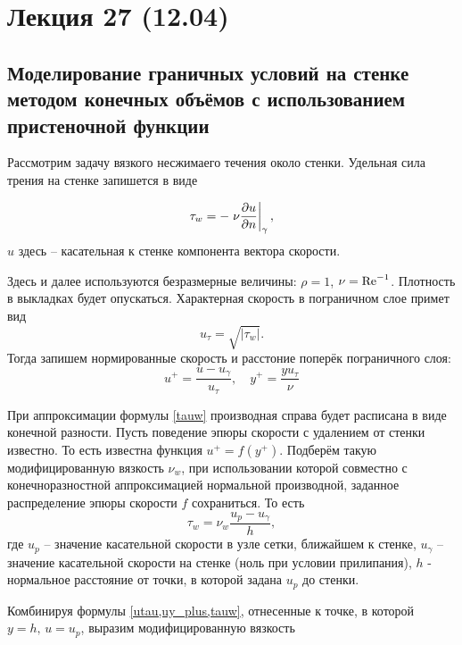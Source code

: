 \section{Лекция 27 (12.04)}

\subsection{Моделирование граничных условий на стенке методом конечных объёмов с использованием пристеночной функции}

Рассмотрим задачу вязкого несжимаего течения около стенки.
Удельная сила трения на стенке запишется в виде

\begin{equation}
\label{tauw}
\tau_w = -\left.\nu\frac{\partial u}{\partial n}\right|_{\gamma},
\end{equation}
$u$ здесь -- касательная к стенке компонента вектора скорости.

Здесь и далее используются безразмерные величины: $\rho=1$, $\nu = \mathrm{Re}^{-1}$.
Плотность в выкладках будет опускаться.
Характерная скорость в пограничном слое примет вид
\begin{equation}
\label{utau}
u_\tau = \sqrt{\left|\tau_w\right|}.
\end{equation}
Тогда запишем нормированные скорость и расстоние поперёк пограничного слоя:
\begin{equation}
\label{uy_plus}
u^{+} = \frac{u - u_\gamma}{u_\tau}, \quad y^{+} = \frac{y u_\tau}{\nu}
\end{equation}

При аппроксимации формулы \cref{tauw} производная справа будет расписана в виде конечной разности.
Пусть поведение эпюры скорости с удалением от стенки известно.
То есть известна функция $u^{+} = f(y^{+})$.
Подберём такую модифицированную вязкость $\nu_w$,
при использовании которой совместно с конечноразностной аппроксимацией
нормальной производной, заданное распределение эпюры скорости $f$ сохраниться.
То есть
\begin{equation}
\label{tauw}
\tau_w = \nu_w  \frac{u_p - u_\gamma}{h},
\end{equation}
где $u_p$ -- значение касательной скорости в узле сетки, ближайшем к стенке,
$u_\gamma$ -- значение касательной скорости  на стенке (ноль при условии прилипания),
$h$ - нормальное расстояние от точки, в которой задана $u_p$ до стенки.

Комбинируя формулы \cref{utau,uy_plus,tauw}, отнесенные к точке, в которой $y=h, \, u=u_p$, выразим модифицированную вязкость

